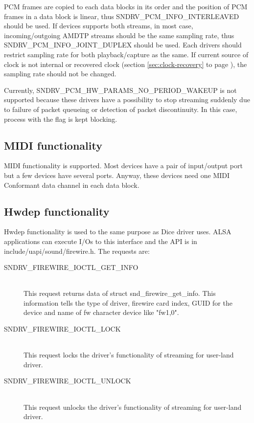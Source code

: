 \documentclass[onecolumn]{article}
\begin{document}
PCM frames are copied to each data blocks in its order and the position of PCM frames in a data block is linear, thus SNDRV\_PCM\_INFO\_INTERLEAVED should be used. If devices supports both streams, in most case, incoming/outgoing AMDTP streams should be the same sampling rate, thus SNDRV\_PCM\_INFO\_JOINT\_DUPLEX should be used. Each drivers should restrict sampling rate for both playback/capture as the same. If current source of clock is not internal or recovered clock (section \ref{sec:clock-recovery} to page \pageref{sec:clock-recovery}), the sampling rate should not be changed.

Currently, SNDRV\_PCM\_HW\_PARAMS\_NO\_PERIOD\_WAKEUP is not supported because these drivers have a possibility to stop streaming suddenly due to failure of packet queueing or detection of packet discontinuity. In this case, process with the flag is kept blocking.

\subsection{MIDI functionality}

MIDI functionality is supported. Most devices have a pair of input/output port but a few devices have several ports. Anyway, these devices need one MIDI Conformant data channel in each data block.

\subsection{Hwdep functionality}
Hwdep functionality is used to the same purpose as Dice driver uses. ALSA applications can execute I/Os to this interface and the API is in include/uapi/sound/firewire.h. The requests are:

\begin{description}
\item [SNDRV\_FIREWIRE\_IOCTL\_GET\_INFO] \mbox{} \\
This request returns data of struct snd\_firewire\_get\_info. This information tells the type of driver, firewire card index, GUID for the device and name of fw character device like "fw1,0".
\item [SNDRV\_FIREWIRE\_IOCTL\_LOCK] \mbox{} \\
This request locks the driver's functionality of streaming for user-land driver.
\item [SNDRV\_FIREWIRE\_IOCTL\_UNLOCK] \mbox{} \\
This request unlocks the driver's functionality of streaming for user-land driver.
\end{description}
\end{document}
